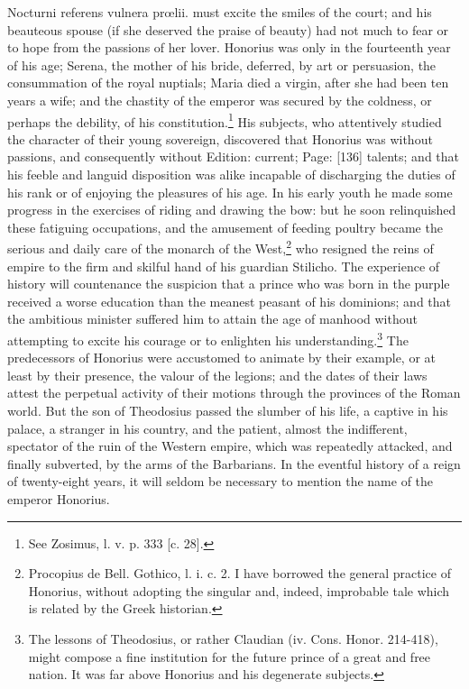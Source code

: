 {Nocturni referens vulnera prœlii.} must excite the smiles of the court; and his beauteous spouse (if she deserved the praise of beauty) had not much to fear or to hope from the passions of her lover. Honorius was only in the fourteenth year of his age; Serena, the mother of his bride, deferred, by art or persuasion, the consummation of the royal nuptials; Maria died a virgin, after she had been ten years a wife; and the chastity of the emperor was secured by the coldness, or perhaps the debility, of his constitution.\footnote{See Zosimus, l. v. p. 333 [c. 28].} His subjects, who attentively studied the character of their young sovereign, discovered that Honorius was without passions, and consequently without Edition: current; Page: [136] talents; and that his feeble and languid disposition was alike incapable of discharging the duties of his rank or of enjoying the pleasures of his age. In his early youth he made some progress in the exercises of riding and drawing the bow: but he soon relinquished these fatiguing occupations, and the amusement of feeding poultry became the serious and daily care of the monarch of the West,\footnote{Procopius de Bell. Gothico, l. i. c. 2. I have borrowed the general practice of Honorius, without adopting the singular and, indeed, improbable tale which is related by the Greek historian.} who resigned the reins of empire to the firm and skilful hand of his guardian Stilicho. The experience of history will countenance the suspicion that a prince who was born in the purple received a worse education than the meanest peasant of his dominions; and that the ambitious minister suffered him to attain the age of manhood without attempting to excite his courage or to enlighten his understanding.\footnote{The lessons of Theodosius, or rather Claudian (iv. Cons. Honor. 214-418), might compose a fine institution for the future prince of a great and free nation. It was far above Honorius and his degenerate subjects.} The predecessors of Honorius were accustomed to animate by their example, or at least by their presence, the valour of the legions; and the dates of their laws attest the perpetual activity of their motions through the provinces of the Roman world. But the son of Theodosius passed the slumber of his life, a captive in his palace, a stranger in his country, and the patient, almost the indifferent, spectator of the ruin of the Western empire, which was repeatedly attacked, and finally subverted, by the arms of the Barbarians. In the eventful history of a reign of twenty-eight years, it will seldom be necessary to mention the name of the emperor Honorius.

